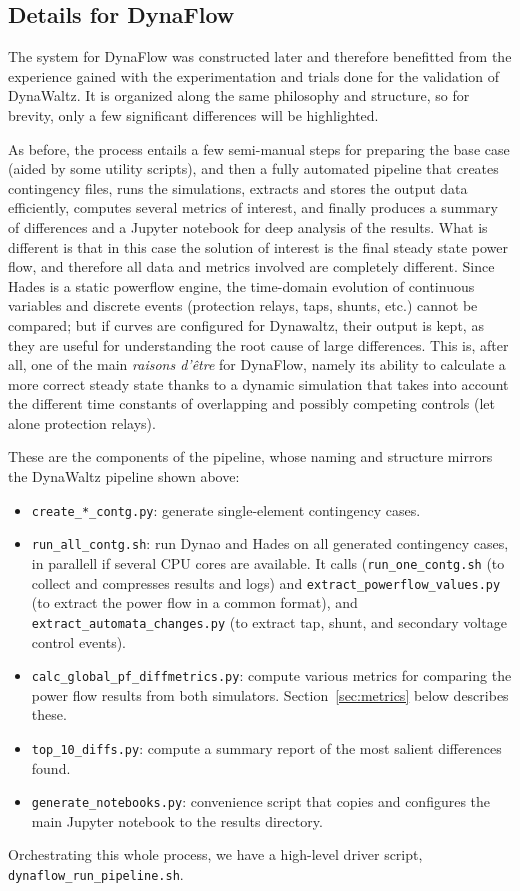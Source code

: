 \documentclass[conference]{IEEEtran}
\newcommand{\Dynawo}{Dyna\textomega o\xspace} %
\newcommand{\code}[1]{\texttt{#1}}
\begin{document}
\subsection{Details for DynaFlow}

The system for DynaFlow was constructed later and therefore benefitted from the
experience gained with the experimentation and trials done for the validation of
DynaWaltz. It is organized along the same philosophy and structure, so for
brevity, only a few significant differences will be highlighted. 

As before, the process entails a few semi-manual steps for preparing the base
case (aided by some utility scripts), and then a fully automated pipeline that
creates contingency files, runs the simulations, extracts and stores the output
data efficiently, computes several metrics of interest, and finally produces a
summary of differences and a Jupyter notebook for deep analysis of the results.
What is different is that in this case the solution of interest is the final
steady state power flow, and therefore all data and metrics involved are
completely different. Since Hades is a static powerflow engine, the time-domain
evolution of continuous variables and discrete events (protection relays, taps,
shunts, etc.) cannot be compared; but if curves are configured for Dynawaltz,
their output is kept, as they are useful for understanding the root cause of
large differences.  This is, after all, one of the main \emph{raisons d'être}
for DynaFlow, namely its ability to calculate a more correct steady state thanks
to a dynamic simulation that takes into account the different time constants of
overlapping and possibly competing controls (let alone protection relays).

These are the components of the pipeline, whose naming and structure mirrors the
DynaWaltz pipeline shown above:
\begin{itemize}
\item \code{create\_*\_contg.py}: generate single-element contingency cases.
\item \code{run\_all\_contg.sh}: run \Dynawo and Hades on all generated
  contingency cases, in parallell if several CPU cores are available.  It calls
  (\code{run\_one\_contg.sh} (to collect and compresses results and logs) and
  \code{extract\_powerflow\_values.py} (to extract the power flow in a common
  format), and \code{extract\_automata\_changes.py} (to extract tap, shunt, and
  secondary voltage control events).
\item \code{calc\_global\_pf\_diffmetrics.py}: compute various metrics
  for comparing the power flow results from both
  simulators. Section~\ref{sec:metrics} below describes these.
\item \code{top\_10\_diffs.py}: compute a summary report of the most salient
  differences found.
\item \code{generate\_notebooks.py}: convenience script that copies and
  configures the main Jupyter notebook to the results directory.
\end{itemize}
Orchestrating this whole process, we have a high-level driver script,
\code{dynaflow\_run\_pipeline.sh}.
\end{document}
